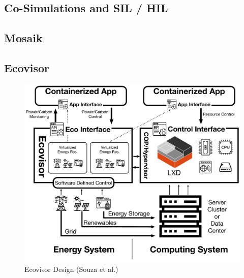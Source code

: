 \subsection{Co-Simulations and SIL / HIL}
\subsection{Mosaik}
\subsection{Ecovisor}

\begin{figure}
    \centering
    \includegraphics[width=\linewidth]{figures/ecovisor_design}
    \caption{Ecovisor Design (Souza et al.) \cite{souza2023}}
    \label{fig:ecovisor_design}
\end{figure}

